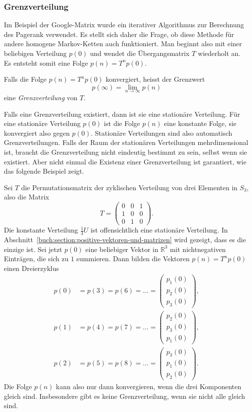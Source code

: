 \subsubsection{Grenzverteilung}
Im Beispiel der Google-Matrix wurde ein iterativer Algorithmus
zur Berechnung des Pagerank verwendet.
Es stellt sich daher die Frage, ob diese Methode für andere homogene
Markov-Ketten auch funktioniert.
Man beginnt also mit einer beliebigen Verteilung $p(0)$ und wendet
die Übergangsmatrix $T$ wiederholt an.
Es entsteht somit eine Folge $p(n) = T^np(0)$.

\begin{definition}
Falls die Folge $p(n) = T^np(0)$ konvergiert, heisst der Grenzwert
\[
p(\infty) = \lim_{n\to\infty} p(n)
\]
eine {\em Grenzverteilung} von $T$.
%
\end{definition}

Falls eine Grenzverteilung existiert, dann ist sie eine stationäre
Verteilung.
Für eine stationäre Verteilung $p(0)$ ist die Folge $p(n)$ eine
konstante Folge, sie konvergiert also gegen $p(0)$.
Stationäre Verteilungen sind also automatisch Grenzverteilungen.
Falls der Raum der stationären Verteilungen mehrdimensional ist,
braucht die Grenzverteilung nicht eindeutig bestimmt zu sein, selbst
wenn sie existiert.
Aber nicht einmal die Existenz einer Grenzverteilung ist garantiert,
wie das folgende Beispiel zeigt.

\begin{beispiel}
Sei $T$ die Permutationsmatrix der zyklischen Verteilung von drei
Elementen in $S_3$, also die Matrix
\[
T=\begin{pmatrix}
0&0&1\\
1&0&0\\
0&1&0
\end{pmatrix}.
\]
Die konstante Verteilung $\frac13U$ ist offensichtlich eine
stationäre Verteilung.
In Abschnitt~\ref{buch:section:positive-vektoren-und-matrizen}
wird gezeigt, dass es die einzige ist.
Sei jetzt $p(0)$ eine beliebiger Vektor in $\mathbb{R}^3$ mit
nichtnegativen Einträgen, die sich zu $1$ summieren.
Dann bilden die Vektoren $p(n)=T^np(0)$ einen Dreierzyklus
\begin{align*}
p(0)&=p(3)=p(6)=\dots =\begin{pmatrix}p_1(0)\\p_2(0)\\p_3(0)\end{pmatrix},
\\
p(1)&=p(4)=p(7)=\dots =\begin{pmatrix}p_2(0)\\p_3(0)\\p_1(0)\end{pmatrix},
\\
p(2)&=p(5)=p(8)=\dots =\begin{pmatrix}p_3(0)\\p_1(0)\\p_2(0)\end{pmatrix}.
\end{align*}
Die Folge $p(n)$ kann also nur dann konvergieren, wenn die drei
Komponenten gleich sind.
Insbesondere gibt es keine Grenzverteilung, wenn sie nicht alle
gleich sind.
\end{beispiel}

